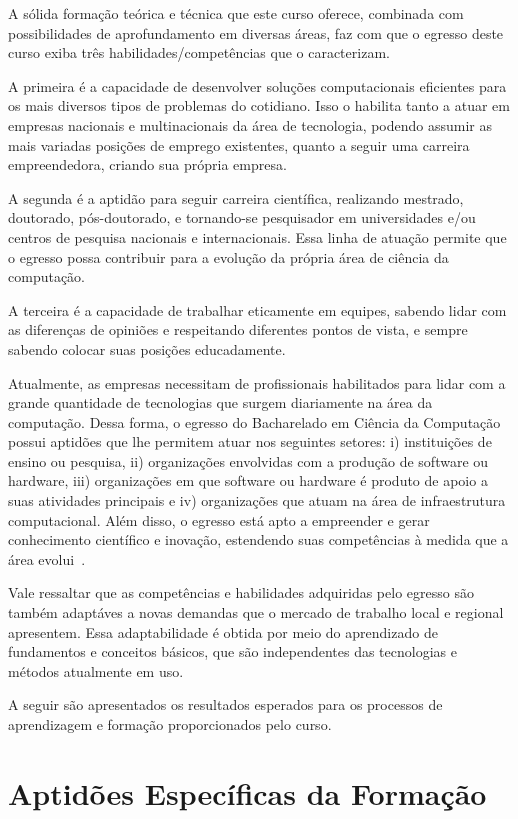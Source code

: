 A sólida formação teórica e técnica que este curso oferece, combinada com possibilidades de aprofundamento em diversas áreas, faz com que o egresso deste curso exiba três habilidades/competências que o caracterizam. 

A primeira é a capacidade de desenvolver soluções computacionais eficientes para os mais diversos tipos de problemas do cotidiano. Isso o habilita tanto a atuar em empresas nacionais e multinacionais da área de tecnologia, podendo assumir as mais variadas posições de emprego existentes, quanto a seguir uma carreira empreendedora, criando sua própria empresa. 

A segunda é a aptidão para seguir carreira científica, realizando mestrado, doutorado, pós-doutorado, e tornando-se pesquisador em universidades e/ou centros de pesquisa nacionais e internacionais. Essa linha de atuação permite que o egresso possa contribuir para a evolução da própria área de ciência da computação.  

A terceira é a capacidade de trabalhar eticamente em equipes, sabendo lidar com as diferenças de opiniões e respeitando diferentes pontos de vista, e sempre sabendo colocar suas posições educadamente. 


Atualmente, as empresas necessitam de profissionais habilitados para lidar com a grande quantidade de tecnologias que surgem diariamente na área da computação. Dessa forma, o egresso do Bacharelado em Ciência da Computação possui aptidões que lhe permitem atuar nos seguintes setores: i) instituições de ensino ou pesquisa, ii) organizações envolvidas com a produção de software ou hardware, iii) organizações em que software ou hardware é produto de apoio a suas atividades principais e iv) organizações que atuam na área de infraestrutura computacional. Além disso, o egresso está apto a empreender e gerar conhecimento científico e inovação, estendendo suas competências à medida que a área evolui~\cite{SBC-Diretrizes}. 

Vale ressaltar que as competências e habilidades adquiridas pelo egresso são também adaptáves a novas demandas que o mercado de trabalho local e regional apresentem. Essa adaptabilidade é obtida por meio do aprendizado de fundamentos e conceitos básicos, que são independentes das tecnologias e métodos atualmente em uso.

A seguir são apresentados os resultados esperados para os processos de aprendizagem e formação proporcionados pelo curso.

\section{Aptidões Específicas da Formação}

